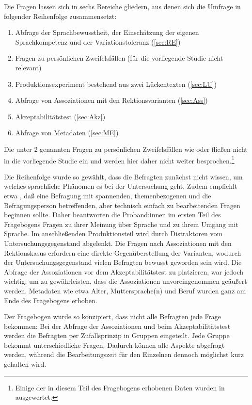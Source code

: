 Die Fragen lassen sich in sechs Bereiche gliedern, aus denen sich die Umfrage in folgender Reihenfolge zusammensetzt: 
\begin{enumerate}
\item Abfrage der Sprachbewusstheit, der Einschätzung der eigenen Sprachkompetenz und der Variationstoleranz (\autoref{sec:RE})
\item Fragen zu persönlichen Zweifelsfällen (für die vorliegende Studie nicht relevant)
\item Produktionsexperiment bestehend aus zwei Lückentexten (\autoref{sec:LU})
\item Abfrage von Assoziationen mit den Rektionsvarianten (\autoref{sec:Ass})
\item Akzeptabilitätstest (\autoref{sec:Akz})
\item Abfrage von Metadaten (\autoref{sec:ME})
\end{enumerate}
Die unter 2 genannten Fragen zu persönlichen Zweifelsfällen wie  oder  fließen nicht in die vorliegende Studie ein und werden hier daher nicht weiter besprochen.\footnote{Einige der in diesem Teil des Fragebogens erhobenen Daten wurden in \citet{Vieregge.2019b} ausgewertet.} 

Die Reihenfolge wurde so gewählt, dass die Befragten zunächst nicht wissen, um welches sprachliche Phänomen es bei der Untersuchung geht. Zudem empfiehlt etwa \citet[741]{PorstSept.1996}, \glqq daß eine Befragung mit spannenden, themenbezogenen und die Befragungsperson betreffenden, aber technisch einfach zu bearbeitenden Fragen beginnen\grqq{} sollte. 
Daher beantworten die Proband:innen im ersten Teil des Fragebogens Fragen zu ihrer Meinung über Sprache und zu ihrem Umgang mit Sprache. Im anschließenden Produktionsteil wird durch Distraktoren vom Untersuchungsgegenstand abgelenkt. 
Die Fragen nach Assoziationen mit den Rektionskasus erfordern eine direkte Gegenüberstellung der Varianten, wodurch der Untersuchungsgegenstand vielen Befragten bewusst geworden sein wird. 
Die Abfrage der Assoziationen vor dem Akzeptabilitätstest zu platzieren, war jedoch wichtig, um zu gewährleisten, dass die Assoziationen unvoreingenommen geäußert werden. Metadaten wie etwa Alter, Muttersprache(n) und Beruf wurden ganz am Ende des Fragebogens erhoben.

\begin{sloppypar}
Der Fragebogen wurde so konzipiert, dass nicht alle Befragten jede Frage bekommen: Bei der Abfrage der Assoziationen und beim Akzeptabilitätstest werden die Befragten per Zufallsprinzip in Gruppen eingeteilt. 
Jede Gruppe bekommt unterschiedliche Fragen. 
Dadurch können alle Aspekte abgefragt werden, während die Bearbeitungszeit für den Einzelnen dennoch möglichst kurz gehalten wird. 
\end{sloppypar}

